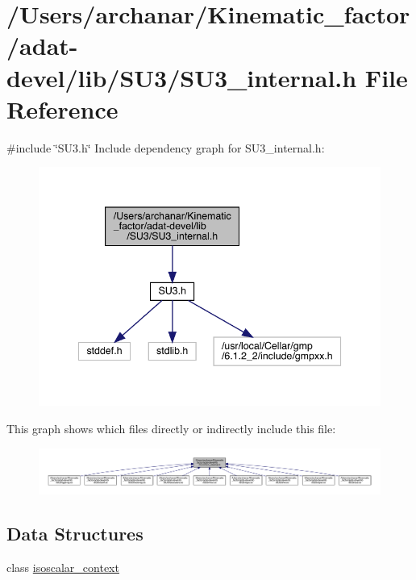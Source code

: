 \hypertarget{adat-devel_2lib_2SU3_2SU3__internal_8h}{}\section{/\+Users/archanar/\+Kinematic\+\_\+factor/adat-\/devel/lib/\+S\+U3/\+S\+U3\+\_\+internal.h File Reference}
\label{adat-devel_2lib_2SU3_2SU3__internal_8h}
{\ttfamily \#include \char`\"{}S\+U3.\+h\char`\"{}}\newline
Include dependency graph for S\+U3\+\_\+internal.\+h\+:
\nopagebreak
\begin{figure}[H]
\begin{center}
\leavevmode
\includegraphics[width=342pt]{d5/d1c/adat-devel_2lib_2SU3_2SU3__internal_8h__incl}
\end{center}
\end{figure}
This graph shows which files directly or indirectly include this file\+:
\nopagebreak
\begin{figure}[H]
\begin{center}
\leavevmode
\includegraphics[width=350pt]{d2/de2/adat-devel_2lib_2SU3_2SU3__internal_8h__dep__incl}
\end{center}
\end{figure}
\subsection*{Data Structures}
\begin{DoxyCompactItemize}
\item 
class \mbox{\hyperlink{classisoscalar__context}{isoscalar\+\_\+context}}
\end{DoxyCompactItemize}
